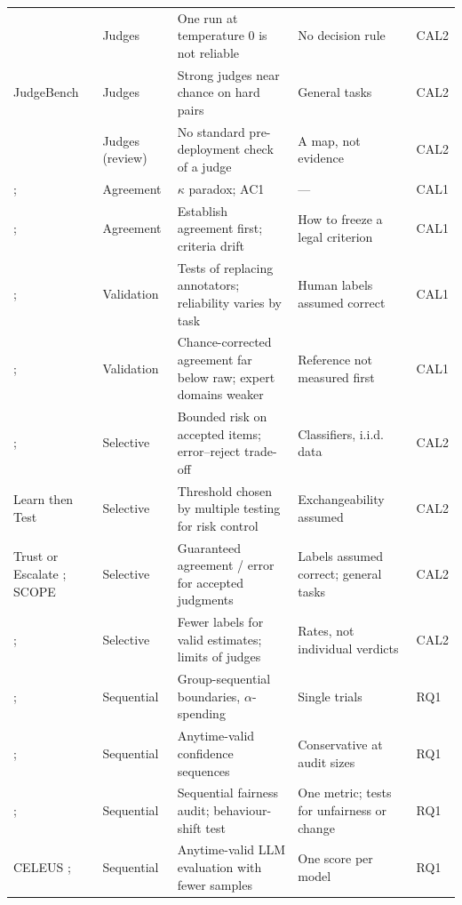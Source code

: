 {\begin{longtable}{@{}>{\raggedright\arraybackslash}p{2.6cm}>{\raggedright\arraybackslash}p{1.8cm}>{\raggedright\arraybackslash}p{4.3cm}>{\raggedright\arraybackslash}p{4.3cm}>{\raggedright\arraybackslash}p{1.3cm}@{}}
\citet{schroeder2024} & Judges & One run at temperature 0 is not reliable & No decision rule & CAL2 \\
JudgeBench \citep{judgebench} & Judges & Strong judges near chance on hard pairs & General tasks & CAL2 \\
\citet{shrestha2026} & Judges (review) & No standard pre-deployment check of a judge & A map, not evidence & CAL2 \\
\citet{feinstein}; \citet{gwet} & Agreement & $\kappa$ paradox; AC1 & --- & CAL1 \\
\citet{artstein2008}; \citet{shankar2024} & Agreement & Establish agreement first; criteria drift & How to freeze a legal criterion & CAL1 \\
\citet{calderon2025}; \citet{bavaresco2025} & Validation & Tests of replacing annotators; reliability varies by task & Human labels assumed correct & CAL1 \\
\citet{norman2026}; \citet{szymanski2025} & Validation & Chance-corrected agreement far below raw; expert domains weaker & Reference not measured first & CAL1 \\
\citet{geifman}; \citet{chow1970} & Selective & Bounded risk on accepted items; error--reject trade-off & Classifiers, i.i.d. data & CAL2 \\
Learn then Test \citep{learntest} & Selective & Threshold chosen by multiple testing for risk control & Exchangeability assumed & CAL2 \\
Trust or Escalate \citep{jung2025}; SCOPE \citep{badshah2026} & Selective & Guaranteed agreement / error for accepted judgments & Labels assumed correct; general tasks & CAL2 \\
\citet{ppi}; \citet{dorner} & Selective & Fewer labels for valid estimates; limits of judges & Rates, not individual verdicts & CAL2 \\
\citet{obrien1979}; \citet{landemets} & Sequential & Group-sequential boundaries, $\alpha$-spending & Single trials & RQ1 \\
\citet{howard}; \citet{waudbysmith2024} & Sequential & Anytime-valid confidence sequences & Conservative at audit sizes & RQ1 \\
\citet{chugg2023}; \citet{richter2025} & Sequential & Sequential fairness audit; behaviour-shift test & One metric; tests for unfairness or change & RQ1 \\
CELEUS \citep{celeus2026}; \citet{hsu2026} & Sequential & Anytime-valid LLM evaluation with fewer samples & One score per model & RQ1 \\

\end{longtable}}
